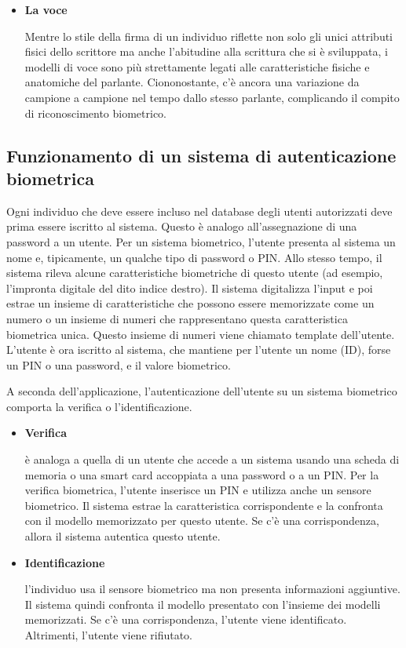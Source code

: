 \begin{itemize}
    \item \textbf{La voce}
    
    Mentre lo stile della firma di un individuo riflette non solo gli unici attributi fisici dello scrittore ma anche l'abitudine alla scrittura che si è sviluppata, i modelli di voce sono più strettamente legati alle caratteristiche fisiche e anatomiche del parlante. Ciononostante, c'è ancora una variazione da campione a campione nel tempo dallo stesso parlante, complicando il compito di riconoscimento biometrico.
    
\end{itemize}

\newpage
\subsection{Funzionamento di un sistema di autenticazione biometrica}
Ogni individuo che deve essere incluso nel database degli utenti autorizzati deve prima essere iscritto al sistema. Questo è analogo all'assegnazione di una password a un utente. Per un sistema biometrico, l'utente presenta al sistema un nome e, tipicamente, un qualche tipo di password o PIN. Allo stesso tempo, il sistema rileva alcune caratteristiche biometriche di questo utente (ad esempio, l'impronta digitale del dito indice destro). Il sistema digitalizza l'input e poi estrae un insieme di caratteristiche che possono essere memorizzate come un numero o un insieme di numeri che rappresentano questa caratteristica biometrica unica. Questo insieme di numeri viene chiamato template dell'utente. L'utente è ora iscritto al sistema, che mantiene per l'utente un nome (ID), forse un PIN o una password, e il valore biometrico.

\singlespacing

A seconda dell'applicazione, l'autenticazione dell'utente su un sistema biometrico comporta la verifica o l'identificazione.
\begin{itemize}
    \item \textbf{Verifica}
    
    è analoga a quella di un utente che accede a un sistema usando una scheda di memoria o una smart card accoppiata a una password o a un PIN. Per la verifica biometrica, l'utente inserisce un PIN e utilizza anche un sensore biometrico. Il sistema estrae la caratteristica corrispondente e la confronta con il modello memorizzato per questo utente. Se c'è una corrispondenza, allora il sistema autentica questo utente.
    
    \item \textbf{Identificazione}
    
    l'individuo usa il sensore biometrico ma non presenta informazioni aggiuntive. Il sistema quindi confronta il modello presentato con l'insieme dei modelli memorizzati. Se c'è una corrispondenza, l'utente viene identificato. Altrimenti, l'utente viene rifiutato.
    
\end{itemize}

